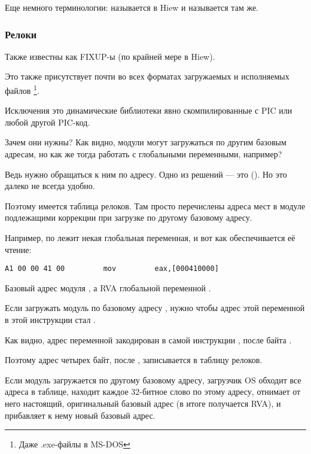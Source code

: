 Еще немного терминологии:  называется  в Hiew и  называется  там же.

\subsubsection{Релоки}
\label{subsec:relocs}

Также известны как FIXUP-ы (по крайней мере в Hiew).

Это также присутствует почти во всех форматах загружаемых и исполняемых файлов
\footnote{Даже .exe-файлы в MS-DOS}.

Исключения это динамические библиотеки явно скомпилированные с \ac{PIC} или любой другой \ac{PIC}-код.

Зачем они нужны?
Как видно, модули могут загружаться по другим базовым адресам,
но как же тогда работать с глобальными переменными, например?

Ведь нужно обращаться к ним по адресу.
Одно из решений --- это \PICcode{} ().  Но это далеко не всегда удобно.

Поэтому имеется таблица релоков. 
Там просто перечислены адреса мест в модуле подлежащими коррекции при загрузке по другому базовому адресу.

Например, по  лежит некая глобальная переменная, и вот как обеспечивается её чтение:

\begin{lstlisting}
A1 00 00 41 00         mov         eax,[000410000]
\end{lstlisting}

Базовый адрес модуля , а \ac{RVA} глобальной переменной .

Если загружать модуль по базовому адресу , нужно чтобы адрес этой переменной в этой инструкции стал .

Как видно, адрес переменной закодирован в самой инструкции , после байта .

Поэтому адрес четырех байт, после , записывается в таблицу релоков.

Если модуль загружается по другому базовому адресу,
загрузчик \ac{OS} обходит все адреса в таблице, 
находит каждое 32-битное слово по этому адресу,
отнимает от него настоящий, оригинальный базовый адрес
(в итоге получается \ac{RVA}), и прибавляет к нему новый базовый адрес.

